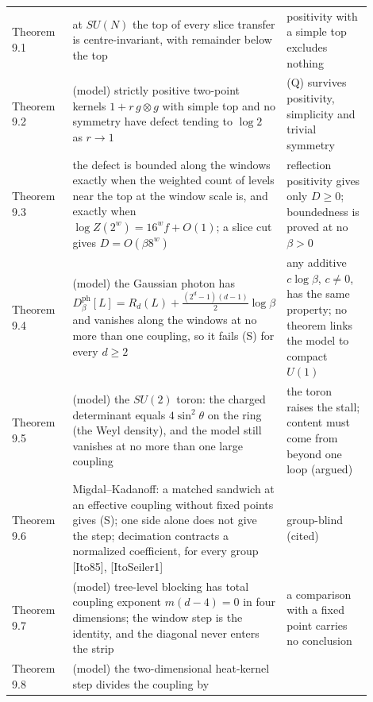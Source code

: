 \documentclass[10pt,letterpaper,twocolumn]{article}
\begin{document}
\begin{center}
{\footnotesize
{}
\tabletail{\midrule}
\tablelasttail{\bottomrule}
\begin{xtabular}{L{0.194\linewidth}L{0.414\linewidth}L{0.289\linewidth}}
Theorem 9.1 & at \(SU(N)\) the top of every slice transfer is centre-invariant, with
remainder below the top & positivity with a simple top excludes nothing \\
Theorem 9.2 & (model) strictly positive two-point kernels \(1+r\,g\otimes g\) with
simple top and no symmetry have defect tending to \(\log2\) as \(r\to1\) & (Q) survives positivity, simplicity and trivial symmetry \\
Theorem 9.3 & the defect is bounded along the windows exactly when the weighted count
of levels near the top at the window scale is, and exactly when
\(\log Z(2^w)=16^wf+O(1)\); a slice cut gives \(D=O(\beta8^w)\) & reflection positivity gives only \(D\ge0\); boundedness is proved at no
\(\beta>0\) \\
Theorem 9.4 & (model) the Gaussian photon has
\(D^{\mathrm{ph}}_\beta[L]=R_d(L)+\tfrac{(2^d-1)(d-1)}2\log\beta\) and
vanishes along the windows at no more than one coupling, so it fails (S)
for every \(d\ge2\) & any additive \(c\log\beta\), \(c\ne0\), has the same property; no
theorem links the model to compact \(U(1)\) \\
Theorem 9.5 & (model) the \(SU(2)\) toron: the charged determinant equals
\(4\sin^2\theta\) on the ring (the Weyl density), and the model still
vanishes at no more than one large coupling & the toron raises the stall; content must come from beyond one loop
(argued) \\
Theorem 9.6 & Migdal--Kadanoff: a matched sandwich at an effective coupling without
fixed points gives (S); one side alone does not give the step;
decimation contracts a normalized coefficient, for every group
{[}Ito85{]}, {[}ItoSeiler1{]} & group-blind (cited) \\
Theorem 9.7 & (model) tree-level blocking has total coupling exponent \(m(d-4)=0\) in
four dimensions; the window step is the identity, and the diagonal never
enters the strip & a comparison with a fixed point carries no conclusion \\
Theorem 9.8 & (model) the two-dimensional heat-kernel step divides the coupling by

\end{xtabular}}
\end{center}
\end{document}
